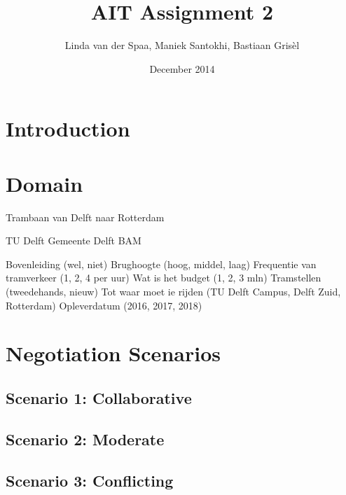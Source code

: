 \documentclass{article}
\title{AIT Assignment 2}
\author{Linda van der Spaa, Maniek Santokhi, Bastiaan Gris\`el}
\date{December 2014}
\begin{document}
\maketitle

\section{Introduction}

\section{Domain}
Trambaan van Delft naar Rotterdam

TU Delft
Gemeente Delft
BAM

Bovenleiding (wel, niet)
Brughoogte (hoog, middel, laag)
Frequentie van tramverkeer (1, 2, 4 per uur)
Wat is het budget (1, 2, 3 mln)
Tramstellen (tweedehands, nieuw)
Tot waar moet ie rijden (TU Delft Campus, Delft Zuid, Rotterdam)
Opleverdatum (2016, 2017, 2018)


\section{Negotiation Scenarios}

\subsection{Scenario 1: Collaborative}


\subsection{Scenario 2: Moderate}


\subsection{Scenario 3: Conflicting}
\end{document}
